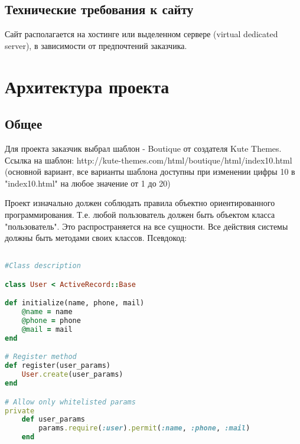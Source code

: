 \documentclass[DIV=calc, paper=a4, fontsize=11pt]{scrartcl} %
\begin{document}
\subsection{Технические требования к сайту}
Сайт располагается на хостинге или выделенном сервере (virtual dedicated server), в зависимости от предпочтений заказчика.



\section{Архитектура проекта}

\subsection{Общее}
Для проекта заказчик выбрал шаблон - Boutique от создателя Kute Themes. Ссылка на шаблон: http://kute-themes.com/html/boutique/html/index10.html (основной вариант, все варианты шаблона доступны при изменении цифры 10 в "index10.html" на любое значение от 1 до 20)

Проект изначально должен соблюдать правила объектно ориентированного программирования. Т.е. любой пользователь должен быть объектом класса "пользователь". Это распространяется на все сущности. Все действия системы должны быть методами своих классов. Псевдокод:
\begin{lstlisting}[language=Ruby]

#Class description

class User < ActiveRecord::Base 

def initialize(name, phone, mail)
	@name = name
	@phone = phone
	@mail = mail
end

# Register method
def register(user_params)
	User.create(user_params)
end

# Allow only whitelisted params
private
	def user_params
		params.require(:user).permit(:name, :phone, :mail)
	end
\end{lstlisting}
\end{document}
